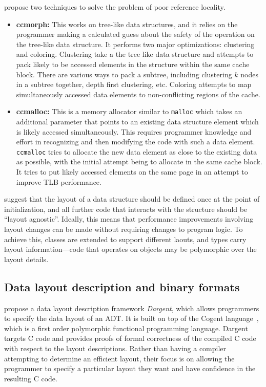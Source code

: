 \documentclass[acmsmall,review,anonymous]{acmart}\settopmatter{printfolios=true,printccs=false,printacmref=false}
\begin{document}
\citet{CSL} propose two techniques to solve the problem of poor reference locality.
\begin{itemize}[leftmargin=*]
\item \textbf{ccmorph:} This works on tree-like data structures, and it relies on the programmer making a calculated guess about the safety of the operation on the tree-like data structure. It performs two major optimizations: clustering and coloring. Clustering take a the tree like data structure and attempts to pack likely to be accessed elements in the structure within the same cache block. There are various ways to pack a subtree, including clustering $k$ nodes in a subtree together, depth first clustering, etc.
Coloring attempts to map simultaneously accessed data elements to non-conflicting regions of the cache.
\item \textbf{ccmalloc:} This is a memory allocator similar to \texttt{malloc} which takes an additional parameter that points to an existing data structure element which is likely accessed simultaneously. This requires programmer knowledge and effort in recognizing and then modifying the code with such a data element. \texttt{ccmalloc} tries to allocate the new data element as close to the existing data as possible, with the initial attempt being to allocate in the same cache block. It tries to put likely accessed elements on the same page in an attempt to improve TLB performance.
\end{itemize}


\citet{Shapes, Shapes2} suggest
that the layout of a data structure should be defined once at the point of initialization, and all further code that interacts with the structure should be ``layout agnostic''. Ideally, this means that performance improvements involving layout changes can be made without requiring changes to program logic. To achieve this, classes are extended to support different laouts, and types carry layout information---code that operates on objects may be polymorphic over the layout details.

\subsection{Data layout description and binary formats}

\citet{Dargent} propose a data layout description framework \emph{Dargent}, which allows programmers to specify the data layout of an ADT. It is built on top of the Cogent language~\cite{o2016cogent}, which is a first order polymorphic functional programming language. Dargent targets C code and provides proofs of formal correctness of the compiled C code with respect to the layout descriptions. Rather than having a compiler attempting to determine an efficient layout, their focus is on allowing the programmer to specify a particular layout they want and have confidence in the resulting C code.
\end{document}
